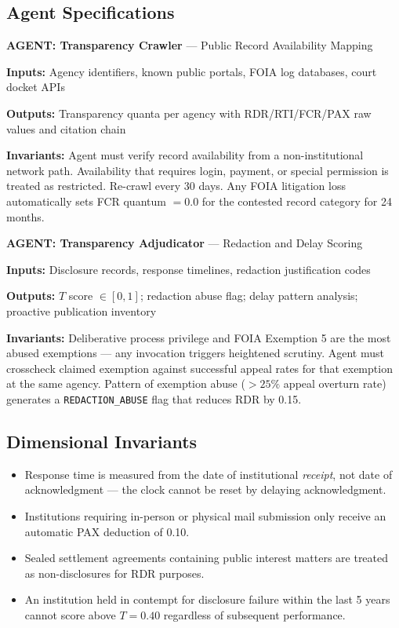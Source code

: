 \documentclass[a4paper,11pt]{article}
\begin{document}
	\subsection{Agent Specifications}
	
	\begin{agentbox}
		\textbf{\sffamily\color{navy} AGENT: Transparency Crawler} — Public Record Availability Mapping
		
		\medskip
		\textbf{Inputs:} Agency identifiers, known public portals, FOIA log databases, court docket APIs
		
		\textbf{Outputs:} Transparency quanta per agency with RDR/RTI/FCR/PAX raw values and citation chain
		
		\textbf{Invariants:} Agent must verify record availability from a non-institutional network path. Availability that requires login, payment, or special permission is treated as restricted. Re-crawl every 30 days. Any FOIA litigation loss automatically sets FCR quantum $= 0.0$ for the contested record category for 24 months.
	\end{agentbox}
	
	\medskip
	
	\begin{agentbox}
		\textbf{\sffamily\color{navy} AGENT: Transparency Adjudicator} — Redaction and Delay Scoring
		
		\medskip
		\textbf{Inputs:} Disclosure records, response timelines, redaction justification codes
		
		\textbf{Outputs:} $T$ score $\in [0,1]$; redaction abuse flag; delay pattern analysis; proactive publication inventory
		
		\textbf{Invariants:} Deliberative process privilege and FOIA Exemption 5 are the most abused exemptions — any invocation triggers heightened scrutiny. Agent must crosscheck claimed exemption against successful appeal rates for that exemption at the same agency. Pattern of exemption abuse ($>25\%$ appeal overturn rate) generates a \texttt{REDACTION\_ABUSE} flag that reduces RDR by 0.15.
	\end{agentbox}
	
	\subsection{Dimensional Invariants}
	
	\begin{itemize}[leftmargin=1.5em]
		\item Response time is measured from the date of institutional \emph{receipt}, not date of acknowledgment — the clock cannot be reset by delaying acknowledgment.
		\item Institutions requiring in-person or physical mail submission only receive an automatic PAX deduction of 0.10.
		\item Sealed settlement agreements containing public interest matters are treated as non-disclosures for RDR purposes.
		\item An institution held in contempt for disclosure failure within the last 5 years cannot score above $T = 0.40$ regardless of subsequent performance.
	\end{itemize}
	
\end{document}
